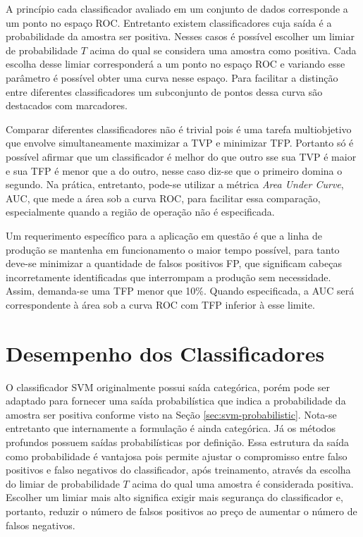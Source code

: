 A princípio cada classificador avaliado em um conjunto de dados corresponde a um ponto no espaço ROC. Entretanto existem classificadores cuja saída é a probabilidade da amostra ser positiva. Nesses casos é possível escolher um limiar de probabilidade $T$ acima do qual se considera uma amostra como positiva. Cada escolha desse limiar corresponderá a um ponto no espaço ROC e variando esse parâmetro é possível obter uma curva nesse espaço. Para facilitar a distinção entre diferentes classificadores um subconjunto de pontos dessa curva são destacados com marcadores.

Comparar diferentes classificadores não é trivial pois é uma tarefa multiobjetivo que envolve simultaneamente maximizar a TVP e minimizar TFP. Portanto só é possível afirmar que um classificador é melhor do que outro sse sua TVP é maior e sua TFP é menor que a do outro, nesse caso diz-se que o primeiro domina o segundo. Na prática, entretanto, pode-se utilizar a métrica \textit{Area Under Curve}, AUC, que mede a área sob a curva ROC, para facilitar essa comparação, especialmente quando a região de operação não é especificada.

Um requerimento específico para a aplicação em questão é que a linha de produção se mantenha em funcionamento o maior tempo possível, para tanto deve-se minimizar a quantidade de falsos positivos FP, que significam cabeças incorretamente identificadas que interrompam a produção sem necessidade. Assim, demanda-se uma TFP menor que 10\%. Quando especificada, a AUC será correspondente à área sob a curva ROC com TFP inferior à esse limite.

\section{Desempenho dos Classificadores}
\label{sec:resultados-classificadores}
O classificador SVM originalmente possui saída categórica, porém pode ser adaptado para fornecer uma saída probabilística que indica a probabilidade da amostra ser positiva conforme visto na Seção \ref{sec:svm-probabilistic}. Nota-se entretanto que internamente a formulação é ainda categórica. Já os métodos profundos possuem saídas probabilísticas por definição. Essa estrutura da saída como probabilidade é vantajosa pois permite ajustar o compromisso entre falso positivos e falso negativos do classificador, após treinamento, através da escolha do limiar de probabilidade $T$ acima do qual uma amostra é considerada positiva. Escolher um limiar mais alto significa exigir mais segurança do classificador e, portanto, reduzir o número de falsos positivos ao preço de aumentar o número de falsos negativos.

